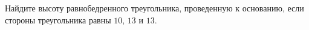 \begin{ex}
	\begin{condition}
		Найдите высоту равнобедренного треугольника, проведенную к основанию, если стороны треугольника равны \( 10 \),	\( 13  \) и \( 13 \).
	\end{condition}
\end{ex}